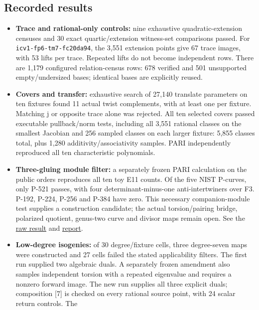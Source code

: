 \documentclass[
  10pt,
]{article}
\providecommand{\tightlist}{%
  \setlength{\itemsep}{0pt}\setlength{\parskip}{0pt}}
\begin{document}
\subsection{Recorded results}\label{recorded-results}

\begin{itemize}
\tightlist
\item
  \textbf{Trace and rational-only controls:} nine exhaustive
  quadratic-extension censuses and 30 exact quartic/extension
  witness-set comparisons passed. For \texttt{icv1-fp6-tm7-fc20da94},
  the 3,551 extension points give 67 trace images, with 53 lifts per
  trace. Repeated lifts do not become independent rows. There are 1,179
  configured relation-census rows: 678 verified and 501 unsupported
  empty/undersized bases; identical bases are explicitly reused.
\item
  \textbf{Covers and transfer:} exhaustive search of 27,140 translate
  parameters on ten fixtures found 11 actual twist complements, with at
  least one per fixture. Matching j or opposite trace alone was
  rejected. All ten selected covers passed executable pullback/norm
  tests, including all 3,551 rational classes on the smallest Jacobian
  and 256 sampled classes on each larger fixture: 5,855 classes total,
  plus 1,280 additivity/associativity samples. PARI independently
  reproduced all ten characteristic polynomials.
\item
  \textbf{Three-gluing module filter:} a separately frozen PARI
  calculation on the public orders reproduces all ten toy E11 counts. Of
  the five NIST P-curves, only P-521 passes, with four
  determinant-minus-one anti-intertwiners over F3. P-192, P-224, P-256
  and P-384 have zero. This necessary companion-module test supplies a
  construction candidate; the actual torsion/pairing bridge, polarized
  quotient, genus-two curve and divisor maps remain open. See the
  \href{../execution-v1/runs/public3-20261022T0132Z/pari.stdout}{raw
  result} and
  \href{execution-20261022T0032Z/public3-20261022T0132Z/REPORT.pdf}{report}.
\item
  \textbf{Low-degree isogenies:} of 30 degree/fixture cells, three
  degree-seven maps were constructed and 27 cells failed the stated
  applicability filters. The first run supplied two algebraic duals. A
  separately frozen amendment also samples independent torsion with a
  repeated eigenvalue and requires a nonzero forward image. The new run
  supplies all three explicit duals; composition {[}7{]} is checked on
  every rational source point, with 24 scalar return controls. The

\end{itemize}
\end{document}
